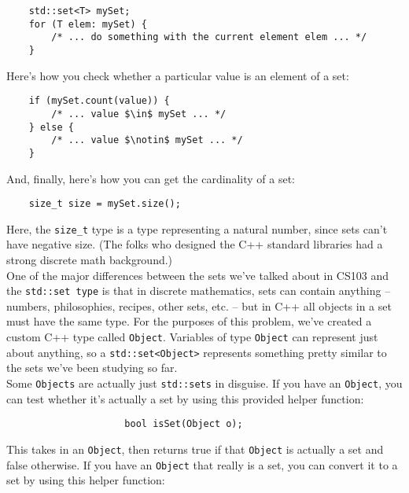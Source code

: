 \documentclass{article}
\renewcommand{\(}{\left(}
\renewcommand{\)}{\right)}
\theoremstyle{plain}
\theoremstyle{plain}
\theoremstyle{definition}
\begin{document}
\begin{verbatim}
	std::set<T> mySet;
	for (T elem: mySet) {
	    /* ... do something with the current element elem ... */
	}
\end{verbatim}

Here's how you check whether a particular value is an element of a set:

\begin{verbatim}
	if (mySet.count(value)) {
	    /* ... value $\in$ mySet ... */
	} else {
	    /* ... value $\notin$ mySet ... */
	}
\end{verbatim}

And, finally, here's how you can get the cardinality of a set:

\begin{verbatim}
	size_t size = mySet.size();
\end{verbatim}

Here, the \texttt{size_t} type is a type representing a natural number, since sets can't have negative size. (The folks who designed the C++ standard libraries had a strong discrete math background.) \\

One of the major differences between the sets we've talked about in CS103 and the \texttt{std::set type} is that in discrete mathematics, sets can contain anything -- numbers, philosophies, recipes, other sets, etc. -- but in C++ all objects in a set must have the same type. For the purposes of this problem, we've created a custom C++ type called \texttt{Object}. Variables of type \texttt{Object} can represent just about anything, so a \texttt{std::set<Object>} represents something pretty similar to the sets we've been studying so far. \\

Some \texttt{Objects} are actually just \texttt{std::sets} in disguise. If you have an \texttt{Object}, you can test whether it's actually a set by using this provided helper function:

\begin{verbatim}
				     bool isSet(Object o);
\end{verbatim}

This takes in an \texttt{Object}, then returns true if that \texttt{Object} is actually a set and false otherwise. If you have an \texttt{Object} that really is a set, you can convert it to a set by using this helper function:
\end{document}
